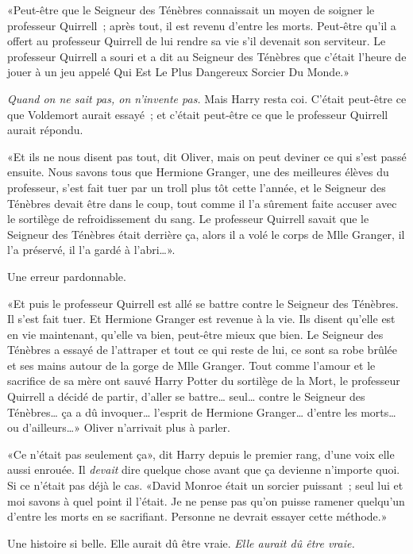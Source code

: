 «Peut-être que le Seigneur des Ténèbres connaissait un moyen de soigner le professeur Quirrell~; après tout, il est revenu d'entre les morts. Peut-être qu'il a offert au professeur Quirrell de lui rendre sa vie s'il devenait son serviteur. Le professeur Quirrell a souri et a dit au Seigneur des Ténèbres que c'était l'heure de jouer à un jeu appelé Qui Est Le Plus Dangereux Sorcier Du Monde.»

\emph{Quand on ne sait pas, on n'invente pas.} Mais Harry resta coi. C'était peut-être ce que Voldemort aurait essayé~; et c'était peut-être ce que le professeur Quirrell aurait répondu.

«Et ils ne nous disent pas tout, dit Oliver, mais on peut deviner ce qui s'est passé ensuite. Nous savons tous que Hermione Granger, une des meilleures élèves du professeur, s'est fait tuer par un troll plus tôt cette l'année, et le Seigneur des Ténèbres devait être dans le coup, tout comme il l'a sûrement faite accuser avec le sortilège de refroidissement du sang. Le professeur Quirrell savait que le Seigneur des Ténèbres était derrière ça, alors il a volé le corps de Mlle Granger, il l'a préservé, il l'a gardé à l'abri…».

Une erreur pardonnable.

«Et puis le professeur Quirrell est allé se battre contre le Seigneur des Ténèbres. Il s'est fait tuer. Et Hermione Granger est revenue à la vie. Ils disent qu'elle est en vie maintenant, qu'elle va bien, peut-être mieux que bien. Le Seigneur des Ténèbres a essayé de l'attraper et tout ce qui reste de lui, ce sont sa robe brûlée et ses mains autour de la gorge de Mlle Granger. Tout comme l'amour et le sacrifice de sa mère ont sauvé Harry Potter du sortilège de la Mort, le professeur Quirrell a décidé de partir, d'aller se battre… seul… contre le Seigneur des Ténèbres… ça a dû invoquer… l'esprit de Hermione Granger… d'entre les morts… ou d'ailleurs…» Oliver n'arrivait plus à parler.

«Ce n'était pas seulement ça», dit Harry depuis le premier rang, d'une voix elle aussi enrouée. Il \emph{devait} dire quelque chose avant que ça devienne n'importe quoi. Si ce n'était pas déjà le cas. «David Monroe était un sorcier puissant~; seul lui et moi savons à quel point il l'était. Je ne pense pas qu'on puisse ramener quelqu'un d'entre les morts en se sacrifiant. Personne ne devrait essayer cette méthode.»

Une histoire si belle. Elle aurait dû être vraie. \emph{Elle aurait dû être vraie.}

